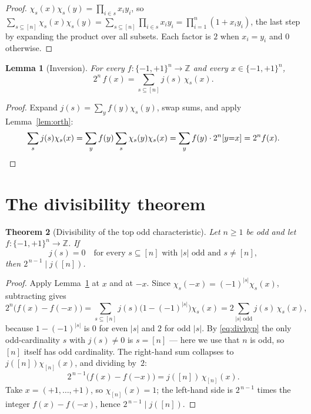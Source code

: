 \documentclass[11pt]{article}
\newtheorem{theorem}{Theorem}
\newtheorem{lemma}[theorem]{Lemma}
\theoremstyle{definition}
\newcommand{\Fpm}{\{-1,+1\}}
\newcommand{\jc}{j}
\begin{document}
\begin{proof}
$\chi_s(x)\chi_s(y)=\prod_{i\in s} x_i y_i$, so
$\sum_{s\subseteq[n]}\chi_s(x)\chi_s(y)=\sum_{s\subseteq[n]}\prod_{i\in s}x_iy_i=\prod_{i=1}^n(1+x_iy_i)$,
the last step by expanding the product over all subsets. Each factor is $2$ when
$x_i=y_i$ and $0$ otherwise.
\end{proof}

\begin{lemma}[Inversion]\label{lem:inv}
For every $f:\Fpm^n\to\mathbb Z$ and every $x\in\Fpm^n$,
\begin{equation}\label{eq:inv}
  2^n\, f(x)=\sum_{s\subseteq[n]} \jc(s)\,\chi_s(x).
\end{equation}
\end{lemma}

\begin{proof}
Expand $\jc(s)=\sum_y f(y)\chi_s(y)$, swap sums, and apply
Lemma~\ref{lem:orth}:
\[
\sum_s\jc(s)\chi_s(x)
=\sum_y f(y)\sum_s\chi_s(y)\chi_s(x)
=\sum_y f(y)\cdot 2^n[y{=}x]
=2^n f(x).\qedhere
\]
\end{proof}

\section{The divisibility theorem}

\begin{theorem}[Divisibility of the top odd characteristic]\label{thm:divis}
Let $n\ge 1$ be \emph{odd} and let $f:\Fpm^n\to\mathbb Z$. If
\begin{equation}\label{eq:divhyp}
  \jc(s)=0 \quad\text{for every }s\subseteq[n]\text{ with $|s|$ odd and }s\ne[n],
\end{equation}
then $2^{\,n-1}\mid \jc([n])$.
\end{theorem}

\begin{proof}
Apply Lemma~\ref{lem:inv} at $x$ and at $-x$. Since
$\chi_s(-x)=(-1)^{|s|}\chi_s(x)$, subtracting gives
\[
  2^n\bigl(f(x)-f(-x)\bigr)
   = \sum_{s\subseteq[n]} \jc(s)\bigl(1-(-1)^{|s|}\bigr)\chi_s(x)
   = 2\!\!\sum_{|s|\text{ odd}}\!\!\jc(s)\,\chi_s(x),
\]
because $1-(-1)^{|s|}$ is $0$ for even $|s|$ and $2$ for odd $|s|$. By
\eqref{eq:divhyp} the only odd-cardinality $s$ with $\jc(s)\ne 0$ is
$s=[n]$ --- here we use that $n$ is odd, so $[n]$ itself has odd cardinality.
The right-hand sum collapses to $\jc([n])\chi_{[n]}(x)$, and dividing by~$2$:
\begin{equation}\label{eq:key}
  2^{\,n-1}\bigl(f(x)-f(-x)\bigr)=\jc([n])\,\chi_{[n]}(x).
\end{equation}
Take $x=(+1,\dots,+1)$, so $\chi_{[n]}(x)=1$; the left-hand side is
$2^{\,n-1}$ times the integer $f(x)-f(-x)$, hence
$2^{\,n-1}\mid \jc([n])$.
\end{proof}
\end{document}
